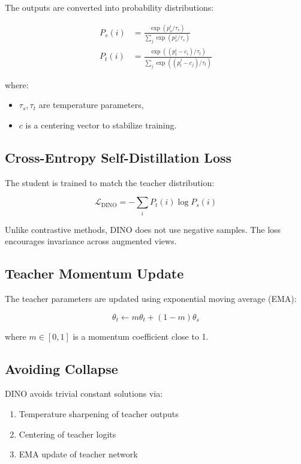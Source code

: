 The outputs are converted into probability distributions:

\begin{align}
P_s(i) &= \frac{\exp(p_s^i / \tau_s)}
{\sum_j \exp(p_s^j / \tau_s)} \\
P_t(i) &= \frac{\exp((p_t^i - c_i) / \tau_t)}
{\sum_j \exp((p_t^j - c_j) / \tau_t)}
\end{align}

where:
\begin{itemize}
    \item $\tau_s, \tau_t$ are temperature parameters,
    \item $c$ is a centering vector to stabilize training.
\end{itemize}

\subsection{Cross-Entropy Self-Distillation Loss}

The student is trained to match the teacher distribution:

\begin{equation}
\mathcal{L}_{\text{DINO}} =
- \sum_i P_t(i) \log P_s(i)
\end{equation}

Unlike contrastive methods, DINO does not use negative samples. The loss encourages invariance across augmented views.

\subsection{Teacher Momentum Update}

The teacher parameters are updated using exponential moving average (EMA):

\begin{equation}
\theta_t \leftarrow m \theta_t + (1 - m)\theta_s
\end{equation}

where $m \in [0,1]$ is a momentum coefficient close to 1.

\subsection{Avoiding Collapse}

DINO avoids trivial constant solutions via:

\begin{enumerate}
    \item Temperature sharpening of teacher outputs
    \item Centering of teacher logits
    \item EMA update of teacher network
\end{enumerate}

